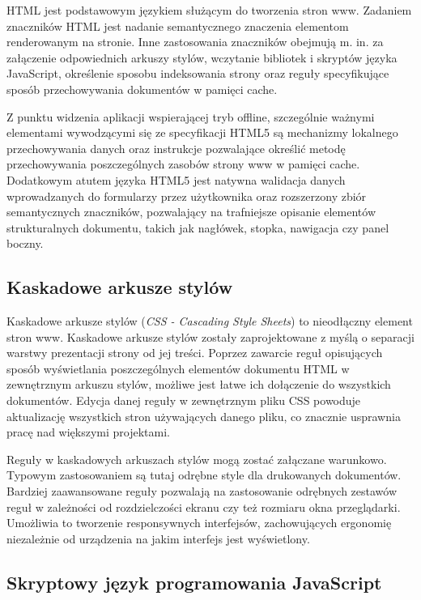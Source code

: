 HTML jest podstawowym językiem służącym do tworzenia stron www. Zadaniem znaczników HTML jest nadanie semantycznego znaczenia elementom renderowanym na stronie. Inne zastosowania znaczników obejmują m. in. za załączenie odpowiednich arkuszy stylów, wczytanie bibliotek i skryptów języka JavaScript, określenie sposobu indeksowania strony oraz reguły specyfikujące sposób przechowywania dokumentów w pamięci cache.

Z punktu widzenia aplikacji wspierającej tryb offline, szczególnie ważnymi elementami wywodzącymi się ze specyfikacji HTML5 są mechanizmy lokalnego przechowywania danych oraz instrukcje pozwalające określić metodę przechowywania poszczególnych zasobów strony www w pamięci cache. Dodatkowym atutem języka HTML5 jest natywna walidacja danych wprowadzanych do formularzy przez użytkownika oraz rozszerzony zbiór semantycznych znaczników, pozwalający na trafniejsze opisanie elementów strukturalnych dokumentu, takich jak nagłówek, stopka, nawigacja czy panel boczny.

\subsection{Kaskadowe arkusze stylów}
\label{sec:css}

Kaskadowe arkusze stylów (\emph{CSS - Cascading Style Sheets}) to nieodłączny element stron www. Kaskadowe arkusze stylów zostały zaprojektowane z myślą o separacji warstwy prezentacji strony od jej treści. Poprzez zawarcie reguł opisujących sposób wyświetlania poszczególnych elementów dokumentu HTML w zewnętrznym arkuszu stylów, możliwe jest łatwe ich dołączenie do wszystkich dokumentów. Edycja danej reguły w zewnętrznym pliku CSS powoduje aktualizację wszystkich stron używających danego pliku, co znacznie usprawnia pracę nad większymi projektami.

Reguły w kaskadowych arkuszach stylów mogą zostać załączane warunkowo. Typowym zastosowaniem są tutaj odrębne style dla drukowanych dokumentów. Bardziej zaawansowane reguły pozwalają na zastosowanie odrębnych zestawów reguł w zależności od rozdzielczości ekranu czy też rozmiaru okna przeglądarki. Umożliwia to tworzenie responsywnych interfejsów, zachowujących ergonomię niezależnie od urządzenia na jakim interfejs jest wyświetlony.

\subsection{Skryptowy język programowania JavaScript}
\label{sec:js}

